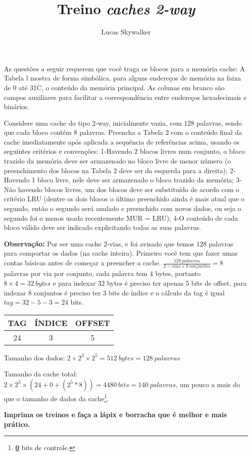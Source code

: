 \documentclass{article}
\author{Lucas Skywalker}
\title{Treino \textit{caches 2-way}}
\begin{document}
As questões a seguir requerem que você traga os blocos para a memória cache: A 
Tabela l mostra de forma simbólica, para alguns endereços de memória
na faixa de 0 até 31C, o conteúdo da memória principal. As colunas em branco
são campos auxiliares para facilitar a correspondência entre endereços
hexadecimais e binários.

Considere uma cache do tipo 2-way, inicialmente vazia, com 128 palavras, sendo
que cada bloco contém 8 palavras. Preencha a Tabela 2 com o conteúdo final da
cache imediatamente após aplicada a sequência de referências acima, usando os
seguintes critérios e convenções: 1-Havendo 2 blocos livres num conjunto, o
bloco trazido da memória deve ser armazenado no bloco livre de menor número (o
preenchimento dos blocos na Tabela 2 deve ser da esquerda para a direita);
2-Havendo 1 bloco livre, nele deve ser armazenado o bloco trazido da memória;
3-Não havendo blocos livres, um dos blocos deve ser substituído de acordo com o
critério LRU (dentre os dois blocos o último preenchido ainda é mais atual que o
segundo, então o segundo será anulado e preenchido com novos dados, ou seja o
segundo foi o menos usado recentemente MUR = LRU); 4-O conteúdo de cada bloco
válido deve ser indicado explicitando todas as suas palavras.


\textbf{Observação:} Por ser uma cache 2-vias, e foi avisado que temos 128
palavras para comportar os dados (na cache inteira). Primeiro você tem que fazer
umas contas básicas antes de começar a preencher a cache. $\frac{128\
palavras}{2-vias \times 8\ conjuntos} = 8$ palavras por via por conjunto, cada
palavra tem 4 bytes, portanto $8 \times 4 = 32\ bytes$ e para indexar 32 bytes 
é preciso ter apenas 5 bits de offset, para indexar 8 conjuntos é preciso ter 3 
bits de índice e o cálculo da tag é igual $tag = 32 - 5 - 3 = 24$ bits.

\begin{tabular}{|c|c|c|}
\hline TAG & ÍNDICE & OFFSET \\
\hline 24 & 3 & 5 \\
\hline
\end{tabular}

Tamanho dos dados: $2 \times 2^{3} \times 2^{5} = 512\ bytes = 128\ palavras$

Tamanho da cache total: $2 \times 2^{3} \times (24 + 0 + (2^{5} * 8)) = 4480\ 
bits = 140\ palavras$, um pouco a mais do que o tamanho de dados da 
cache\footnote{\textbf{\underline{0}} bits de controle.}.

\begin{center}
\Large \textbf{Imprima os treinos e faça a lápix e borracha que é melhor e 
mais prático.}
\end{center}
\end{document}
